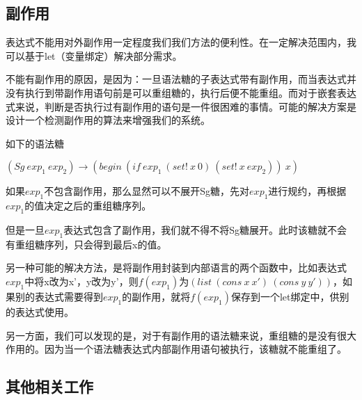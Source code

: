 \label{mark:side}\subsection{副作用}

表达式不能用对外副作用一定程度我们我们方法的便利性。在一定解决范围内，我可以基于let（变量绑定）解决部分需求。

不能有副作用的原因，是因为：一旦语法糖的子表达式带有副作用，而当表达式并没有执行到带副作用语句前是可以重组糖的，执行后便不能重组。而对于嵌套表达式来说，判断是否执行过有副作用的语句是一件很困难的事情。可能的解决方案是设计一个检测副作用的算法来增强我们的系统。

如下的语法糖

$(Sg~exp_{1}~exp_{2})→(begin~(if~exp_{1}~(set!~x~0)~(set!~x~exp_{2}))~x)$

如果$exp_{1}$不包含副作用，那么显然可以不展开Sg糖，先对$exp_{1}$进行规约，再根据$exp_{1}$的值决定之后的重组糖序列。

但是一旦$exp_{1}$表达式包含了副作用，我们就不得不将Sg糖展开。此时该糖就不会有重组糖序列，只会得到最后x的值。

另一种可能的解决方法，是将副作用封装到内部语言的两个函数中，比如表达式$exp_{1}$中将x改为x'，y改为y'，则$f(exp_{1})$为$(list~(cons~x~x')~(cons~y~y'))$，如果别的表达式需要得到$exp_{1}$的副作用，就将$f(exp_{1})$保存到一个let绑定中，供别的表达式使用。

另一方面，我们可以发现的是，对于有副作用的语法糖来说，重组糖的是没有很大作用的。因为当一个语法糖表达式内部副作用语句被执行，该糖就不能重组了。



\subsection{其他相关工作}

